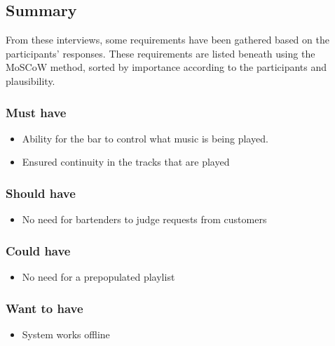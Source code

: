 




\subsection{Summary}
\label{sub:summary}
From these interviews, some requirements have been gathered based on the participants' responses. These requirements are listed beneath using the MoSCoW method, sorted by importance according to the participants and plausibility.
\subsubsection{Must have}
\begin{itemize}
	\item Ability for the bar to control what music is being played.
	\item Ensured continuity in the tracks that are played
\end{itemize}
\subsubsection{Should have}
\begin{itemize}
	\item No need for bartenders to judge requests from customers
\end{itemize}
\subsubsection{Could have}
\begin{itemize}
	\item No need for a prepopulated playlist
\end{itemize}
\subsubsection{Want to have}
\begin{itemize}
	\item System works offline
\end{itemize}
